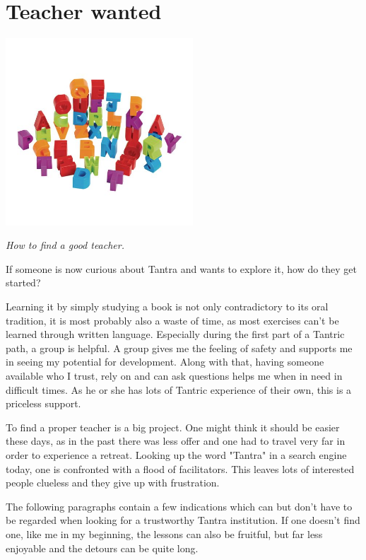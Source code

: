 \section{Teacher wanted}

\begin{center}
\includegraphics[width=7cm]{images/07_teacher.jpg}
\end{center}

\textit{How to find a good teacher.}

If someone is now curious about Tantra and wants to explore it, how do they  get started?

Learning it by simply studying a book is not only contradictory to its oral tradition, it is most probably also a waste of time, as most exercises can't be learned through written language. Especially during the first part of a Tantric path, a group is helpful. A group gives me the feeling of safety and supports me in seeing my potential for development. Along with that, having someone available who I trust, rely on and can ask questions helps me when in need in difficult times. As he or she has lots of Tantric experience of their own, this is a priceless support.

To find a proper teacher is a big project. One might think it should be easier these days, as in the past there was less offer and one had to travel very far in order to experience a retreat. Looking up the word "Tantra" in a search engine today, one is confronted with a flood of facilitators. This leaves lots of interested people clueless and they give up with frustration.

The following paragraphs contain a few indications which can but don't have to be regarded when looking for a trustworthy Tantra institution. If one doesn't find one, like me in my beginning, the lessons can also be fruitful, but far less enjoyable and the detours can be quite long.

